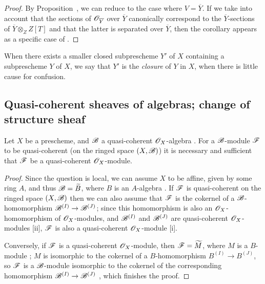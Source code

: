\begin{proof}
\label{proof-1.9.5.11}
By Proposition~, we can reduce to the case where $V=\overline{Y}$.
If we take into account that the sections of $\mathscr{O}_{\overline{Y}}$ over $\overline{Y}$ canonically correspond to the $\overline{Y}$-sections of $\overline{Y}\otimes_Z Z[T]$  and that the latter is separated over $\overline{Y}$, then the corollary appears as a specific case of .
\end{proof}

When there exists a smaller closed subprescheme $Y'$ of $X$ containing a subprescheme $Y$ of $X$, we say that $Y'$ is the \emph{closure} of $Y$ in $X$, when there is little cause for confusion.

\subsection{Quasi-coherent sheaves of algebras; change of structure sheaf}
\label{subsection:1.9.6}

\begin{proposition}[9.6.1]
\label{1.9.6.1}
Let $X$ be a prescheme, and $\mathscr{B}$ a quasi-coherent $\mathscr{O}_X$-algebra .
For a $\mathscr{B}$-module $\mathscr{F}$ to be quasi-coherent (on the ringed space $(X,\mathscr{B})$) it is necessary and sufficient that $\mathscr{F}$ be a quasi-coherent $\mathscr{O}_X$-module.
\end{proposition}

\begin{proof}
\label{proof-1.9.6.1}
Since the question is local, we can assume $X$ to be affine, given by some ring $A$, and thus $\mathscr{B}={\widetilde{B}}$, where $B$ is an $A$-algebra .
If $\mathscr{F}$ is quasi-coherent on the ringed space $(X,\mathscr{B})$ then we can also assume that $\mathscr{F}$ is the cokernel of a $\mathscr{B}$-homomorphism $\sh{B}^{(I)}\to\sh{B}^{(J)}$; since this homomorphism is also an $\mathscr{O}_X$-homomorphism of $\mathscr{O}_X$-modules, and $\mathscr{B}^{(I)}$ and $\mathscr{B}^{(J)}$ are quasi-coherent $\mathscr{O}_X$-modules [ii], $\mathscr{F}$ is also a quasi-coherent $\mathscr{O}_X$-module [i].

Conversely, if $\mathscr{F}$ is a quasi-coherent $\mathscr{O}_X$-module, then $\mathscr{F}={\widetilde{M}}$, where $M$ is a $B$-module ; $M$ is isomorphic to the cokernel of a $B$-homomorphism $B^{(I)}\to B^{(J)}$, so $\mathscr{F}$ is a $\mathscr{B}$-module isomorphic to the cokernel of the corresponding homomorphism $\sh{B}^{(I)}\to\sh{B}^{(J)}$ , which finishes the proof.
\end{proof}

